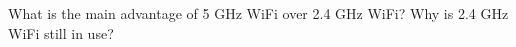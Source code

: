 


\begin{exercise}
    What is the main advantage of 5 GHz WiFi over 2.4 GHz WiFi? Why is 2.4 GHz WiFi still in use?
\end{exercise}